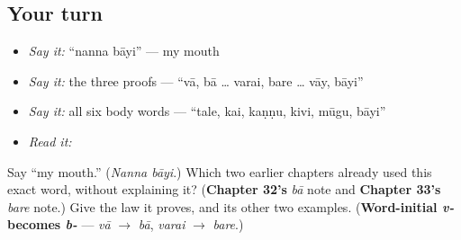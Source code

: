 \subsection*{Your turn}
\begin{itemize}
\raggedright
  \item \emph{Say it:} \textquotedblleft{}nanna bāyi\textquotedblright{} — my mouth
  \item \emph{Say it:} the three proofs — \textquotedblleft{}vā, bā … varai, bare … vāy, bāyi\textquotedblright{}
  \item \emph{Say it:} all six body words — \textquotedblleft{}tale, kai, kaṇṇu, kivi, mūgu, bāyi\textquotedblright{}
  \item \emph{Read it:} \textbf{ }
\end{itemize}

\begin{tcolorbox}[breakable,colback=teal!4,colframe=teal!35!black,title={Before you move on}]
Say \textquotedblleft{}my mouth.\textquotedblright{} (\emph{Nanna bāyi}.) Which two earlier chapters already used this exact word, without explaining it? (\textbf{Chapter 32's} \emph{bā} note and \textbf{Chapter 33's} \emph{bare} note.) Give the law it proves, and its other two examples. (\textbf{Word-initial \emph{v-} becomes \emph{b-}} — \emph{vā} $\to$ \emph{bā}, \emph{varai} $\to$ \emph{bare}.)
\end{tcolorbox}
